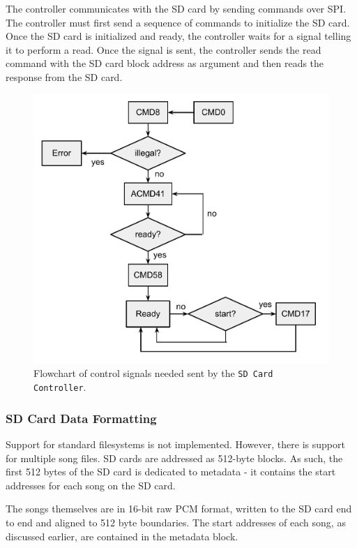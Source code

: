 \documentclass{article}
\begin{document}
The controller communicates with the SD card by sending commands over SPI.
The controller must first send a sequence of commands to initialize the SD card.
Once the SD card is initialized and ready, the controller waits for a signal
telling it to perform a read. Once the signal is sent, the controller sends
the read command with the SD card block address as argument and then reads
the response from the SD card.

\begin{figure}[H]
	\centering
	\includegraphics[scale=0.3]{sd-controller}
	\caption{Flowchart of control signals needed sent by the \texttt{SD Card Controller}. }
\end{figure}

\subsubsection{SD Card Data Formatting}

Support for standard filesystems is not implemented. However, there is support
for multiple song files. SD cards are addressed as 512-byte blocks. As such,
the first 512 bytes of the SD card is dedicated to metadata - it contains the
start addresses for each song on the SD card.

The songs themselves are in 16-bit raw PCM format, written to the SD card end
to end and aligned to 512 byte boundaries. The start addresses of each
song, as discussed earlier, are contained in the metadata block.
\end{document}
